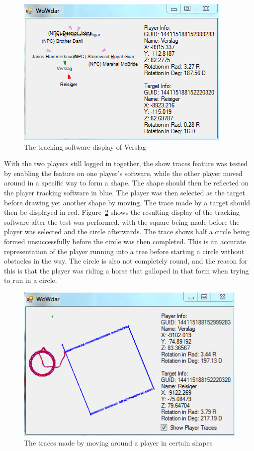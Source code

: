 \begin{figure}[htbp]
\centering
\includegraphics[scale = 0.8]{targetek1.png}	
\caption{The tracking software display of Verslag}
\label{targetek1}
\end{figure}

With the two players still logged in together, the show traces feature was tested by enabling the feature on one player's software, while the other player moved around in a specific way to form a shape. The shape should then be reflected on the player tracking software in blue. The player was then selected as the target before drawing yet another shape by moving. The trace made by a target should then be displayed in red. Figure~\ref{vierkant} shows the resulting display of the tracking software after the test was performed, with the square being made before the player was selected and the circle afterwards. The trace shows half a circle being formed unsuccessfully before the circle was then completed. This is an accurate representation of the player running into a tree before starting a circle without obstacles in the way. The circle is also not completely round, and the reason for this is that the player was riding a horse that galloped in that form when trying to run in a circle.


\begin{figure}[htbp]
\centering
\includegraphics[scale = 0.75]{vierkant1.png}	
\caption{The traces made by moving around a player in certain shapes}
\label{vierkant}
\end{figure}


